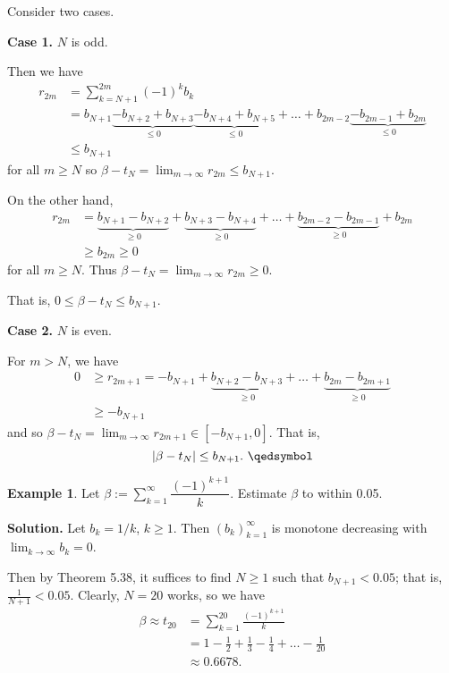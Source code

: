 \documentclass[11pt]{article}
\theoremstyle{definition}
\newtheorem{exmp}[thm]{Example}
\begin{document}
Consider two cases.

\textbf{Case 1.} $N$ is odd. 

Then we have
\begin{align*}
r_{2m} & = \sum_{k=N+1}^{2m} (-1)^k b_k \\
& = b_{N+1} \underbrace{- b_{N+2} + b_{N+3}}_{\leq 0} \underbrace{- b_{N+4} + b_{N+5}}_{\leq 0} + \dots + b_{2m - 2} \underbrace{- b_{2m-1} + b_{2m}}_{\leq 0} \\
& \leq b_{N+1}
\end{align*}
for all $m \geq N$ so $\beta - t_N = \lim_{m\to\infty} r_{2m} \leq b_{N+1}$.

On the other hand,
\begin{align*}
r_{2m} & = \underbrace{b_{N+1} - b_{N+2}}_{\geq 0} + \underbrace{b_{N+3} - b_{N+4}}_{\geq 0} + \dots + \underbrace{b_{2m-2} - b_{2m-1}}_{\geq 0} + b_{2m} \\
& \geq b_{2m} \geq 0
\end{align*}
for all $m \geq N$. Thus $\beta - t_N = \lim_{m\to\infty} r_{2m} \geq 0$.

That is, $0 \leq \beta - t_N \leq b_{N+1}$. 

\textbf{Case 2.} $N$ is even. 

For $m > N$, we have
\begin{align*}
0 & \geq r_{2m+1} = -b_{N+1} + \underbrace{b_{N+2} - b_{N+3}}_{\geq 0} + \dots + \underbrace{b_{2m} - b_{2m+1}}_{\geq 0} \\
& \geq -b_{N+1}
\end{align*}
and so $\beta - t_N = \lim_{m\to\infty} r_{2m+1} \in [-b_{N+1}, 0]$. That is,
$$|\beta - t_N| \leq b_{N+1}. \text{ } \qedsymbol$$

\begin{exmp}
Let $\beta := \displaystyle\sum_{k=1}^\infty \dfrac{(-1)^{k+1}}k$. Estimate $\beta$ to within 0.05. 
\end{exmp}
\textbf{Solution.} Let $b_k = 1/k$, $k \geq 1$. Then $(b_k)_{k=1}^\infty$ is monotone decreasing with $\lim_{k\to\infty} b_k = 0$. 

Then by Theorem 5.38, it suffices to find $N \geq 1$ such that $b_{N+1} < 0.05$; that is, $\frac{1}{N+1} < 0.05$. Clearly, $N = 20$ works, so we have
\begin{align*}
\beta \approx t_{20} & = \sum_{k=1}^{20} \frac{(-1)^{k+1}}k \\
& = 1 - \frac12 + \frac13 - \frac14 + \dots - \frac1{20} \\
& \approx 0.6678.
\end{align*}
\end{document}
